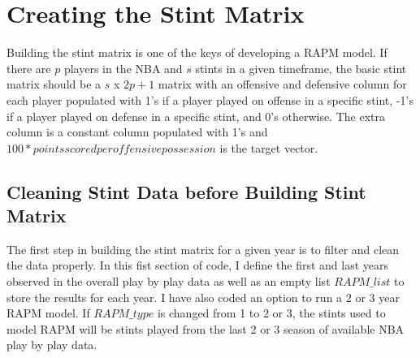 \documentclass[]{article}
\newenvironment{Shaded}{\begin{snugshade}}{\end{snugshade}}
\newcommand{\KeywordTok}[1]{\textcolor[rgb]{0.13,0.29,0.53}{\textbf{#1}}}
\newcommand{\StringTok}[1]{\textcolor[rgb]{0.31,0.60,0.02}{#1}}
\newcommand{\OperatorTok}[1]{\textcolor[rgb]{0.81,0.36,0.00}{\textbf{#1}}}
\newcommand{\NormalTok}[1]{#1}
\begin{document}
\begin{Shaded}
\end{Shaded}

\section{Creating the Stint Matrix}

Building the stint matrix is one of the keys of developing a RAPM model.
If there are \(p\) players in the NBA and \(s\) stints in a given
timeframe, the basic stint matrix should be a \(s\) x \(2p + 1\) matrix
with an offensive and defensive column for each player populated with
1's if a player played on offense in a specific stint, -1's if a player
played on defense in a specific stint, and 0's otherwise. The extra
column is a constant column populated with 1's and
\(100 * points scored per offensive possession\) is the target vector.

\subsection{Cleaning Stint Data before Building Stint Matrix}

The first step in building the stint matrix for a given year is to
filter and clean the data properly. In this fist section of code, I
define the first and last years observed in the overall play by play
data as well as an empty list \(RAPM\_list\) to store the results for
each year. I have also coded an option to run a 2 or 3 year RAPM model.
If \(RAPM\_type\) is changed from 1 to 2 or 3, the stints used to model
RAPM will be stints played from the last 2 or 3 season of available NBA
play by play data.
\end{document}
